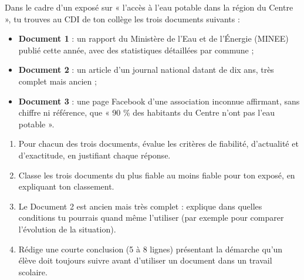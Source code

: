 \documentclass[11pt]{article}
\begin{document}
\begin{exercice}
Dans le cadre d'un exposé sur « l'accès à l'eau potable dans la région du Centre », tu trouves au CDI de ton collège les trois documents suivants :

\begin{itemize}
\item \textbf{Document 1} : un rapport du Ministère de l'Eau et de l'Énergie (MINEE) publié cette année, avec des statistiques détaillées par commune ;
\item \textbf{Document 2} : un article d'un journal national datant de dix ans, très complet mais ancien ;
\item \textbf{Document 3} : une page Facebook d'une association inconnue affirmant, sans chiffre ni référence, que « 90 \% des habitants du Centre n'ont pas l'eau potable ».
\end{itemize}

\begin{enumerate}
\item Pour chacun des trois documents, évalue les critères de fiabilité, d'actualité et d'exactitude, en justifiant chaque réponse.
\item Classe les trois documents du plus fiable au moins fiable pour ton exposé, en expliquant ton classement.
\item Le Document 2 est ancien mais très complet : explique dans quelles conditions tu pourrais quand même l'utiliser (par exemple pour comparer l'évolution de la situation).
\item Rédige une courte conclusion (5 à 8 lignes) présentant la démarche qu'un élève doit toujours suivre avant d'utiliser un document dans un travail scolaire.
\end{enumerate}
\end{exercice}
\end{document}
